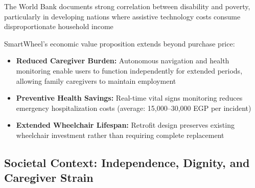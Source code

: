 \documentclass[12pt,a4paper]{report}
\renewcommand{\arraystretch}{1.45}
\renewcommand{\arraystretch}{1.3}
\begin{document}
The World Bank documents strong correlation between disability and poverty, particularly in
developing nations where assistive technology costs consume disproportionate household income


SmartWheel's economic value proposition extends beyond purchase price:

\begin{itemize}[leftmargin=*,itemsep=4pt]
    \item \textbf{Reduced Caregiver Burden:} Autonomous navigation and health monitoring
          enable users to function independently for extended periods, allowing family
          caregivers to maintain employment
    \item \textbf{Preventive Health Savings:} Real-time vital signs monitoring reduces
          emergency hospitalization costs (average: 15,000--30,000 EGP per incident)
    \item \textbf{Extended Wheelchair Lifespan:} Retrofit design preserves existing
          wheelchair investment rather than requiring complete replacement
\end{itemize}

\subsection{Societal Context: Independence, Dignity, and Caregiver Strain}
\end{document}
